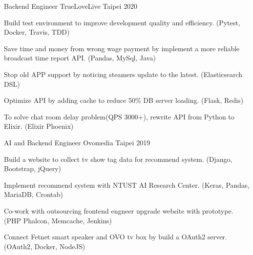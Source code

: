 

\begin{cventries}

  \cventry
    {Backend Engineer} %
    {TrueLoveLive} %
    {Taipei} %
    {2020} %
    {
      \begin{cvitems} %
        \item {Build test environment to improve development quality and efficiency. (Pytest, Docker, Travis, TDD)}
        \item {Save time and money from wrong wage payment by implement a more reliable broadcast time report API. (Pandas, MySql, Java)}
        \item {Stop old APP support by noticing steamers update to the latest. (Elasticsearch DSL)}
        \item {Optimize API by adding cache to reduce 50\% DB server loading. (Flask, Redis)}
        \item {To solve chat room delay problem(QPS 3000+), rewrite API from Python to Elixir. (Elixir Phoenix)}
      \end{cvitems}
    }

  \cventry
    {AI and Backend Engineer} %
    {Ovomedia} %
    {Taipei} %
    {2019} %
    {
      \begin{cvitems} %
        \item {Build a website to collect tv show tag data for recommend system. (Django, Bootstrap, jQuery)}
        \item {Implement recommend system with NTUST AI Research Center. (Keras, Pandas, MariaDB, Crontab)}
        \item {Co-work with outsourcing frontend engneer upgrade website with prototype. (PHP Phalcon, Memcache, Jenkins)}
        \item {Connect Fetnet smart speaker and OVO tv box by build a OAuth2 server. (OAuth2, Docker, NodeJS)}
      \end{cvitems}
    }

\end{cventries}
